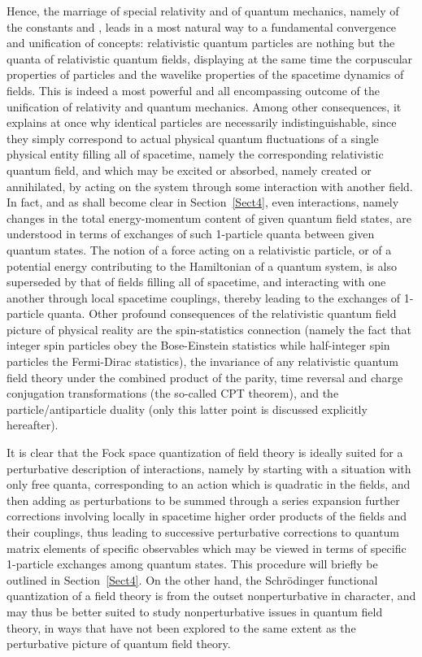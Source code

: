 \documentclass[a4paper,11pt]{article}
\begin{document}
Hence, the marriage of special relativity and of quantum me\-cha\-nics, 
namely of the constants \coordHE{} and \myHighlight{$\hbar$}\coordHE{}, leads in a most natural way
to a fundamental convergence and unification of concepts: relativistic 
quantum particles
are nothing but the quanta of relativistic quantum fields, displaying
at the same time the corpuscular properties of particles and the
wavelike properties of the spacetime dynamics of fields. This is indeed
a most powerful and all encompassing outcome of the unification of
relativity and quantum me\-cha\-nics. Among other consequences, it explains
at once why identical particles are necessarily indistinguishable,
since they simply correspond to actual physical quantum fluctuations
of a single physical entity filling all of spacetime, namely the
corresponding relativistic quantum field, and which may be excited or
absorbed, namely created or annihilated, by acting on the system
through some interaction with another field. In fact, and as shall
become clear in Section~\ref{Sect4}, even interactions, namely changes
in the total energy-momentum content of given quantum field states,
are understood in terms of exchanges of such 1-particle quanta between
given quantum states. The notion of a force acting on a re\-la\-ti\-vistic
particle, or of a potential energy contributing to the Hamiltonian
of a quantum system, is also superseded by that of fields filling all
of spacetime, and interacting with one another through local spacetime
couplings, thereby leading to the exchanges of 1-particle quanta.
Other profound consequences of the relativistic quantum field picture
of physical reality are the spin-statistics connection (namely the fact
that integer spin particles obey the Bose-Einstein statistics while
half-integer spin particles the Fermi-Dirac statistics), the invariance
of any relativistic quantum field theory under the combined product of
the parity, time reversal and charge conjugation transformations (the 
so-called CPT theorem), and the particle/antiparticle duality (only this 
latter point is discussed explicitly hereafter).

It is clear that the Fock space quantization of field theory is
ideally suited for a perturbative description of interactions, namely
by starting with a situation with only free quanta, corresponding to
an action which is quadratic in the fields, and then adding as
perturbations to be summed through a series expansion
further corrections involving locally in spacetime higher order
pro\-ducts of the fields and their couplings, thus leading to
successive perturbative corrections to quantum matrix elements of specific
observables which may be viewed in terms of specific 1-particle exchanges
among quantum states. This procedure will briefly be outlined in 
Section~\ref{Sect4}. On the other hand, the Schr\"odinger functional 
quantization of a field theory is from the outset nonperturbative in 
character, and may thus be better suited to study nonperturbative issues 
in quantum field theory, in ways that have not been explored to the same 
extent as the perturbative picture of quantum field theory.
\end{document}
